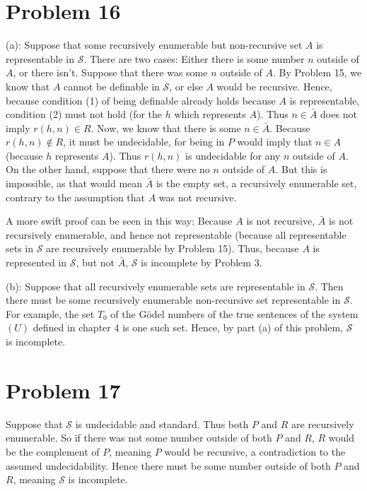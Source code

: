 \documentclass{article}
\theoremstyle{definition}
\begin{document}
\section*{Problem 16}
(a): Suppose that some recursively enumerable but non-recursive set $A$ is representable in $\mathcal{S}$. There are two cases: Either there is some number $n$ outside of $A$, or there 
isn't. Suppose that there was some $n$ outside of $A$. By Problem 15, we know that $A$ cannot be definable in $\mathcal{S}$, or else $A$ would be recursive. Hence, because condition (1) of 
being definable already holds because $A$ is representable, condition (2) must not hold (for the $h$ which represents $A$). Thus $n\in\bar{A}$ does not imply $r(h,n)\in R$. Now, we know that 
there is some $n\in\bar{A}$. Because $r(h,n)\notin R$, it must be undecidable, for being in $P$ would imply that $n\in A$ (because $h$ represents $A$). Thus $r(h,n)$ is undecidable for any $n$ 
outside of $A$. On the other hand, suppose that there were no $n$ outside of $A$. But this is impossible, as that would mean $\bar{A}$ is the empty set, a recursively enumerable set, contrary 
to the assumption that $A$ was not recursive. 


A more swift proof can be seen in this way: Because $A$ is not recursive, $\bar{A}$ is not recursively enumerable, and hence not representable (because all representable sets in $\mathcal{S}$ 
are recursively enumerable by Problem 15). Thus, because $A$ is represented in $\mathcal{S}$, but not $\bar{A}$, $\mathcal{S}$ is incomplete by Problem 3. 

(b): Suppose that all recursively enumerable sets are representable in $\mathcal{S}$. Then there must be some recursively enumerable non-recursive set representable in $\mathcal{S}$. For 
example, the set $T_0$ of the Gödel numbers of the true sentences of the system $(U)$ defined in chapter 4 is one such set. Hence, by part (a) of this problem, $\mathcal{S}$ is incomplete.

\section*{Problem 17}
Suppose that $\mathcal{S}$ is undecidable and standard. Thus both $P$ and $R$ are recursively enumerable. So if there was not some number outside of both $P$ and $R$, $R$ would be the 
complement of $P$, meaning $P$ would be recursive, a contradiction to the assumed undecidability. Hence there must be some number outside of both $P$ and $R$, meaning $\mathcal{S}$ is 
incomplete. 
\end{document}

